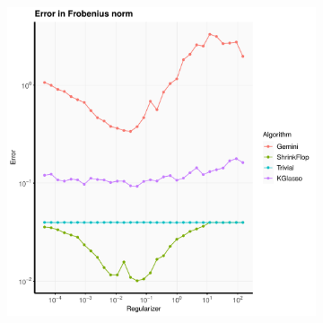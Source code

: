 \documentclass[aos]{imsart}
\theoremstyle{definition}
\numberwithin{equation}{section}
\newcommand{\CF}[1]{{\color{purple}[CF: #1]}}
\newcommand{\CF}[1]{{}}
\begin{document}

\begin{figure}
         \centering
          \begin{subfigure}[b]{.4\textwidth}
         \includegraphics[width=\textwidth]{./code/zhou-comparison/25-50-spiked-frob.pdf}
         \end{subfigure}
          \begin{subfigure}[b]{.4\textwidth}

\end{subfigure}
\end{figure}
\end{document}
